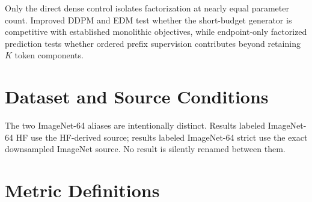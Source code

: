 \documentclass[letterpaper]{article}
\begin{document}
Only the direct dense control isolates factorization at nearly equal parameter
count. Improved DDPM and EDM test whether the short-budget generator is
competitive with established monolithic objectives, while endpoint-only
factorized prediction tests whether ordered prefix supervision contributes
beyond retaining $K$ token components.

\section{Dataset and Source Conditions}

The two ImageNet-64 aliases are intentionally distinct. Results labeled
ImageNet-64 HF use the HF-derived source; results labeled ImageNet-64 strict use
the exact downsampled ImageNet source. No result is silently renamed between
them.

\begin{table}[t]
  \centering
  \scriptsize
  \caption{Dataset roles in the locked evidence matrix.}
  \label{tab:supp-datasets}
\end{table}

\section{Metric Definitions}
\end{document}
